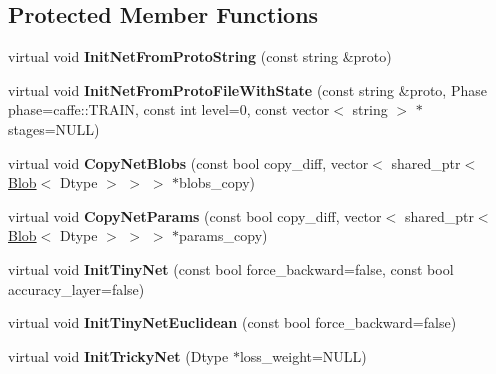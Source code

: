\subsection*{Protected Member Functions}
\begin{DoxyCompactItemize}
\item 
\mbox{\label{classcaffe_1_1_net_test_a1e6efb4248f80a93f8d09f0718326002}} 
virtual void {\bfseries Init\+Net\+From\+Proto\+String} (const string \&proto)
\item 
\mbox{\label{classcaffe_1_1_net_test_a9576bacbf921b7283758223d023c8196}} 
virtual void {\bfseries Init\+Net\+From\+Proto\+File\+With\+State} (const string \&proto, Phase phase=caffe\+::\+T\+R\+A\+IN, const int level=0, const vector$<$ string $>$ $\ast$stages=N\+U\+LL)
\item 
\mbox{\label{classcaffe_1_1_net_test_ab0ab79e8aeca300995ba77eabfd7d6d5}} 
virtual void {\bfseries Copy\+Net\+Blobs} (const bool copy\+\_\+diff, vector$<$ shared\+\_\+ptr$<$ \mbox{\hyperlink{classcaffe_1_1_blob}{Blob}}$<$ Dtype $>$ $>$ $>$ $\ast$blobs\+\_\+copy)
\item 
\mbox{\label{classcaffe_1_1_net_test_ada51b1768cf6fa03921d519dbd845a0d}} 
virtual void {\bfseries Copy\+Net\+Params} (const bool copy\+\_\+diff, vector$<$ shared\+\_\+ptr$<$ \mbox{\hyperlink{classcaffe_1_1_blob}{Blob}}$<$ Dtype $>$ $>$ $>$ $\ast$params\+\_\+copy)
\item 
\mbox{\label{classcaffe_1_1_net_test_ab5212e82c2faeb26876331f148398744}} 
virtual void {\bfseries Init\+Tiny\+Net} (const bool force\+\_\+backward=false, const bool accuracy\+\_\+layer=false)
\item 
\mbox{\label{classcaffe_1_1_net_test_a3b17b3f055a157ca5319574e6ce07984}} 
virtual void {\bfseries Init\+Tiny\+Net\+Euclidean} (const bool force\+\_\+backward=false)
\item 
\mbox{\label{classcaffe_1_1_net_test_a1130cfc530e944a69d56e883a5501f1d}} 
virtual void {\bfseries Init\+Tricky\+Net} (Dtype $\ast$loss\+\_\+weight=N\+U\+LL)
\item 

\end{DoxyCompactItemize}
